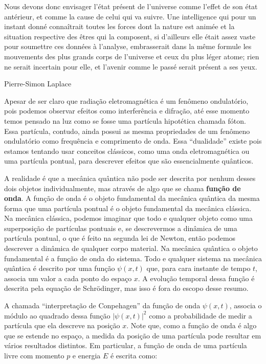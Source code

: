 \documentclass{article}
\begin{document}
\epigraph{Nous devons donc envisager l'\'etat présent de l'universe comme l'effet de son \'etat ant\'erieur, et comme la cause de celui qui va suivre. Une intelligence qui pour un instant donn\'e conna\^itrait toutes les forces dont la nature est anim\'ee et la situation respective des \^etres qui la composent, si d'ailleurs elle \'etait assez vaste pour soumettre ces donn\'ees \`a l'analyse, embrasserait dans la m\^eme formule les mouvements des plus grands corps de l'universe et ceux du plus l\'eger atome; rien ne serait incertain pour elle, et l'avenir comme le passé serait présent a ses yeux.}{Pierre-Simon Laplace}

Apesar de ser claro que radia\c c\~ao eletromagn\'etica \'e um fen\^omeno ondulat\'orio, pois podemos observar efeitos como interfer\^encia e difra\c c\~ao, at\'e esse momento temos pensado na luz como se fosse uma part\'icula hipot\'etica chamada f\'oton. Essa part\'icula, contudo, ainda possui as mesma propriedades de um fen\^omeno ondulat\'orio como frequ\^encia e comprimento de onda. Essa ``dualidade'' existe pois estamos tentando usar conceitos cl\'assicos, como uma onda eletromagn\'etica ou uma part\'icula pontual, para descrever efeitos que s\~ao essencialmente qu\^anticos.

A realidade \'e que a mec\^anica qu\^antica n\~ao pode ser descrita por nenhum desses dois objetos individualmente, mas atrav\'es de algo que se chama \textbf{fun\c c\~ao de onda}. A fun\c c\~ao de onda \'e o objeto fundamental da mec\^anica qu\^antica da mesma forma que uma part\'icula pontual \'e o objeto fundamental da mec\^anica cl\'assica. Na mec\^anica cl\'assica, podemos imaginar que todo e qualquer objeto como uma superposi\c c\~ao de part\'iculas pontuais e, se descrevermos a din\^amica de uma part\'icula pontual, o que \'e feito na segunda lei de Newton, ent\~ao podemos descrever a din\^amica de qualquer corpo material. Na mecânica qu\^antica o objeto fundamental \'e a fun\c c\~ao de onda do sistema. Todo e qualquer sistema na mec\^anica qu\^antica \'e descrito por uma fun\c c\~ao $\psi(x,t)$ que, para cara instante de tempo $t$, associa um valor a cada ponto do espa\c co $x$. A evolu\c c\~ao temporal dessa fun\c c\~ao \'e descrita pela equa\c c\~ao de Schr\"odinger, mas isso \'e fora do escopo desse resumo.

A chamada ``interpreta\c c\~ao de Conpehagen'' da fun\c c\~ao de onda $\psi(x,t)$, associa o m\'odulo ao quadrado dessa fun\c c\~ao $|\psi(x,t)|^2$ como a probabilidade de medir a part\'icula que ela descreve na posi\c c\~ao $x$. Note que, como a fun\c c\~ao de onda \'e algo que se estende no espa\c co, a medida da posi\c c\~ao de uma part\'icula pode resultar em v\'arios resultados distintos. Em particular, a fun\c c\~ao de onda de uma part\'icula livre com momento $p$ e energia $E$ \'e escrita como:
\end{document}
